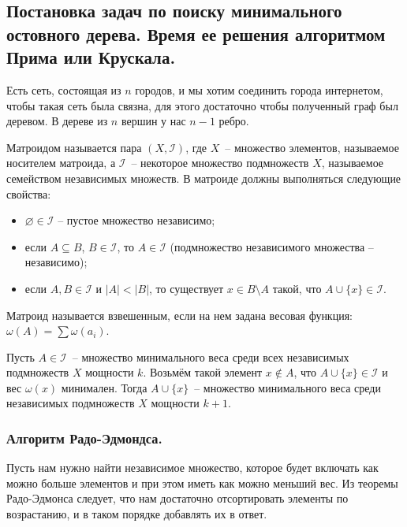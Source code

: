 \documentclass[a4paper,14pt]{article}
\begin{document}
    \subsection{Постановка задач по поиску минимального остовного дерева. Время ее решения алгоритмом Прима или Крускала.}
    \begin{problem}
        Есть сеть, состоящая из $n$ городов, и мы хотим соединить города
    интернетом, чтобы такая сеть была связна, для этого достаточно
    чтобы полученный граф был деревом. В дереве из $n$ вершин у нас
    $n-1$ ребро.
    \end{problem}
    \begin{Def}
        Матроидом называется пара $(X, \mathcal{I})$, где $X$~-- множество элементов, называемое носителем матроида, а $\mathcal{I}$~-- некоторое множество подмножеств $X$, называемое семейством независимых множеств. В матроиде должны выполняться следующие свойства:  
        \begin{itemize}
        \item $\varnothing \in \mathcal{I}$ -- пустое множество независимо;
        \item если $A \subseteq B$, $B \in \mathcal{I}$, то $A \in \mathcal{I}$ (подмножество независимого множества -- независимо);
        \item если $A, B \in \mathcal{I}$ и $|A| < |B|$, то существует $x \in B \setminus A$ такой, что $A \cup \{x\} \in \mathcal{I}$.
        \end{itemize}
    \end{Def}
    \begin{Def}
        Матроид называется взвешенным, если на нем задана весовая функция: $\omega(A)=\sum \omega(a_i)$.
    \end{Def}
    \begin{theorem}
        Пусть $A \in \mathcal{I}$~-- множество минимального веса среди всех независимых подмножеств $X$ мощности $k$. Возьмём такой элемент $x \notin A$, что $A \cup \{x\} \in \mathcal{I}$ и вес $\omega(x)$ минимален. Тогда $A \cup \{x\}$~-- множество минимального веса среди независимых подмножеств $X$ мощности $k+1$.
    \end{theorem}
    \subsubsection*{Алгоритм Радо-Эдмондса.}
        Пусть нам нужно найти независимое множество, которое будет
    включать как можно больше элементов и при этом иметь как
    можно меньший вес. Из теоремы Радо-Эдмонса следует, что нам
    достаточно отсортировать элементы по возрастанию, и в таком
    порядке добавлять их в ответ.
    
\end{document}
